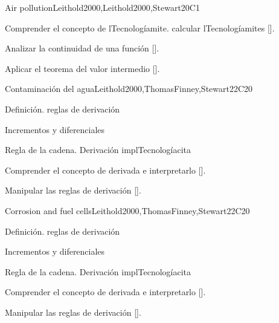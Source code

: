 \begin{syllabus}
\begin{unit}{}{Air pollution}{Leithold2000,Leithold2000,Stewart}{20}{C1}
   \begin{learningoutcomes}
      \item Comprender el concepto de lTecnologíamite. calcular lTecnologíamites [\Assessment].
      \item Analizar la continuidad de una función [\Assessment].
      \item Aplicar el teorema del valor intermedio [\Assessment].
      \end{learningoutcomes}
\end{unit}

\begin{unit}{}{Contaminación del agua}{Leithold2000,ThomasFinney,Stewart}{22}{C20}
   \begin{topics}
      \item Definición. reglas de derivación
      \item Incrementos y diferenciales
      \item Regla de la cadena. Derivación implTecnologíacita

   \end{topics}

   \begin{learningoutcomes}
      \item Comprender el concepto de derivada e interpretarlo [\Assessment].
      \item Manipular las reglas de derivación [\Assessment].
      \end{learningoutcomes}
\end{unit}


\begin{unit}{}{Corrosion and fuel cells}{Leithold2000,ThomasFinney,Stewart}{22}{C20}
   \begin{topics}
      \item Definición. reglas de derivación
      \item Incrementos y diferenciales
      \item Regla de la cadena. Derivación implTecnologíacita

   \end{topics}

   \begin{learningoutcomes}
      \item Comprender el concepto de derivada e interpretarlo [\Assessment].
      \item Manipular las reglas de derivación [\Assessment].
      \end{learningoutcomes}
\end{unit}



\begin{coursebibliography}
\end{coursebibliography}

\end{syllabus}

%

